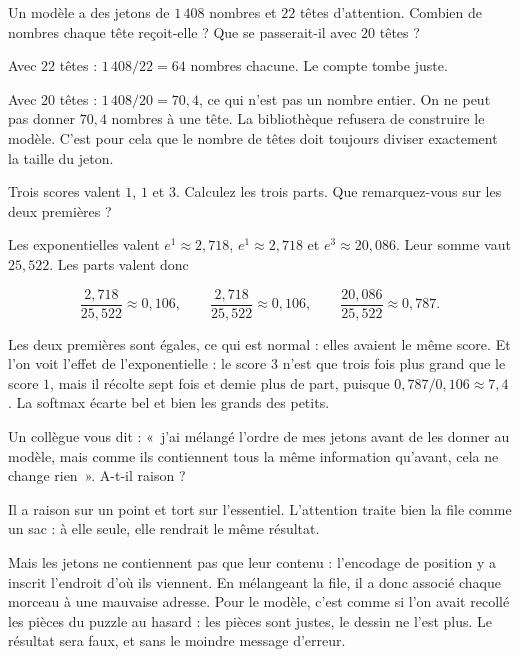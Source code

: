 \begin{exercice}
Un modèle a des jetons de $1\,408$ nombres et $22$ têtes d'attention.
Combien de nombres chaque tête reçoit-elle ? Que se passerait-il avec $20$
têtes ?
\end{exercice}

\begin{solution}
Avec $22$ têtes : $1\,408 / 22 = 64$ nombres chacune. Le compte tombe juste.

Avec $20$ têtes : $1\,408 / 20 = 70{,}4$, ce qui n'est pas un nombre entier.
On ne peut pas donner $70{,}4$ nombres à une tête. La bibliothèque refusera
de construire le modèle. C'est pour cela que le nombre de têtes doit toujours
diviser exactement la taille du jeton.
\end{solution}

\begin{exercice}
Trois scores valent $1$, $1$ et $3$. Calculez les trois parts. Que
remarquez-vous sur les deux premières ?
\end{exercice}

\begin{solution}
Les exponentielles valent $e^1 \approx 2{,}718$, $e^1 \approx 2{,}718$ et
$e^3 \approx 20{,}086$. Leur somme vaut $25{,}522$. Les parts valent donc

\[
  \frac{2{,}718}{25{,}522} \approx 0{,}106, \qquad
  \frac{2{,}718}{25{,}522} \approx 0{,}106, \qquad
  \frac{20{,}086}{25{,}522} \approx 0{,}787 .
\]

Les deux premières sont égales, ce qui est normal : elles avaient le même
score. Et l'on voit l'effet de l'exponentielle : le score $3$ n'est que trois
fois plus grand que le score $1$, mais il récolte sept fois et demie plus de
part, puisque $0{,}787 / 0{,}106 \approx 7{,}4$. La softmax écarte bel et
bien les grands des petits.
\end{solution}

\begin{exercice}
Un collègue vous dit : «~j'ai mélangé l'ordre de mes jetons avant de les
donner au modèle, mais comme ils contiennent tous la même information
qu'avant, cela ne change rien~». A-t-il raison ?
\end{exercice}

\begin{solution}
Il a raison sur un point et tort sur l'essentiel. L'attention traite bien la
file comme un sac : à elle seule, elle rendrait le même résultat.

Mais les jetons ne contiennent pas que leur contenu : l'encodage de position
y a inscrit l'endroit d'où ils viennent. En mélangeant la file, il a donc
associé chaque morceau à une mauvaise adresse. Pour le modèle, c'est comme
si l'on avait recollé les pièces du puzzle au hasard : les pièces sont
justes, le dessin ne l'est plus. Le résultat sera faux, et sans le moindre
message d'erreur.
\end{solution}

